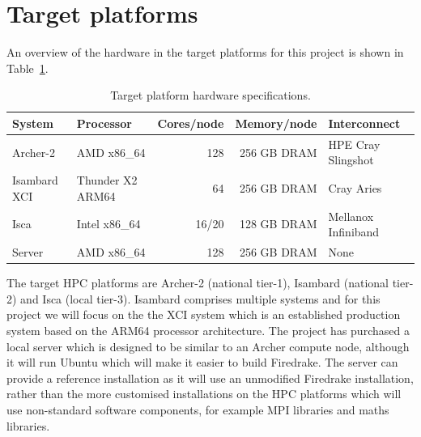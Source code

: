 \documentclass[a4paper,titlepage]{article}
\begin{document}

\section{Target platforms}
\label{section:target_platforms}

An overview of the hardware in the target platforms for this project is shown in Table~\ref{tab:hardware}. 
%
\begin{table}[htp]
\begin{center}
\begin{tabular}{|l|l|r|r|l|}
\hline 
System         & Processor        & Cores/node & Memory/node     & Interconnect \\
\hline
Archer-2       & AMD x86\_64         & 128        & 256 GB DRAM  & HPE Cray Slingshot  \\
Isambard XCI   & Thunder X2 ARM64    &  64        & 256 GB DRAM  & Cray Aries          \\
Isca           & Intel x86\_64       & 16/20      & 128 GB DRAM  & Mellanox Infiniband \\
Server         & AMD x86\_64         & 128        & 256 GB DRAM  & None                \\
\hline
\end{tabular}
\end{center}
\caption{Target platform hardware specifications.}
\label{tab:hardware}
\end{table}%
The target HPC platforms are Archer-2 (national tier-1), Isambard (national tier-2) and Isca (local tier-3). Isambard comprises multiple systems and for this project we will focus on the the XCI system which is an established production system based on the ARM64 processor architecture. The project has purchased a local server which is designed to be similar to an Archer compute node, although it will run Ubuntu which will make it easier to build Firedrake. The server can provide a reference installation as it will use an unmodified Firedrake installation, rather than the more customised installations on the HPC platforms which will use non-standard software components, for example MPI libraries and maths libraries.
\end{document}
